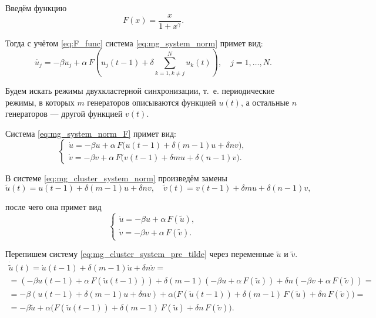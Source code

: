 Введём функцию
%
\begin{equation}
	\label{eq:F_func}
	F(x) = \dfrac{x}{1 + x^\gamma}.
\end{equation}

Тогда с учётом \eqref{eq:F_func} система \eqref{eq:mg_system_norm} примет вид:
%
\begin{equation}
	\label{eq:mg_system_norm_F}
	\dot{u_j} = -\beta u_j + \alpha\,F\left(u_j(t - 1) + \delta \sum_{k = 1, k\neq j}^{N}u_{k}(t)\right), \quad j = 1, \ldots, N.
\end{equation}

Будем искать режимы двухкластерной синхронизации, т.~е. периодические режимы, в которых $m$ генераторов описываются функцией $u(t)$, а остальные $n$ генераторов --- другой функцией $v(t)$.

Система \eqref{eq:mg_system_norm_F} примет вид:
%
\begin{equation}
	\label{eq:mg_cluster_system_norm}
	\begin{cases}
		\dot{u} = -\beta u + \alpha \, F \big(u(t - 1) + \delta (m - 1) u + \delta n v\big),\\
		\dot{v} = -\beta v + \alpha  \, F \big(v(t - 1) + \delta m u + \delta (n - 1) v\big).
	\end{cases}
\end{equation}

В системе \eqref{eq:mg_cluster_system_norm} произведём замены 
\begin{equation}
	\label{eq:tilde_change}
	\tilde{u}(t) = u(t - 1) + \delta (m - 1) u + \delta n v, \quad \tilde{v}(t) = v(t - 1) + \delta m u + \delta (n - 1) v,
\end{equation}

после чего она примет вид
%
\begin{equation}
	\label{eq:mg_cluster_system_pre_tilde}
	\begin{cases}
		\dot{u} = -\beta u + \alpha \, F(\tilde{u}),\\
		\dot{v} = -\beta v + \alpha \, F(\tilde{v}).
	\end{cases}
\end{equation}


Перепишем систему \eqref{eq:mg_cluster_system_pre_tilde} через переменные $\tilde{u}$ и $\tilde{v}$.
\begin{multline*}
	\dot{\tilde{u}}(t) = \dot{u}(t - 1) + \delta (m - 1) \dot{u} + \delta n \dot{v} =\\= \left(-\beta u(t - 1) + \alpha \, F(\tilde{u}(t - 1))\right) + \delta (m - 1)(-\beta u + \alpha\, F(\tilde{u})) + \delta n (-\beta v + \alpha \, F(\tilde{v})) =\\
	= -\beta(u(t - 1) + \delta (m - 1)u + \delta nv) + \alpha\big(F(\tilde{u}(t - 1)) + \delta (m - 1) \, F(\tilde{u}) + \delta n \, F(\tilde{v})\big) = \\
	= -\beta \tilde{u} + \alpha \big(F(\tilde{u}(t - 1)) + \delta (m - 1)\, F(\tilde{u}) + \delta n \, F(\tilde{v})\big).
\end{multline*}

